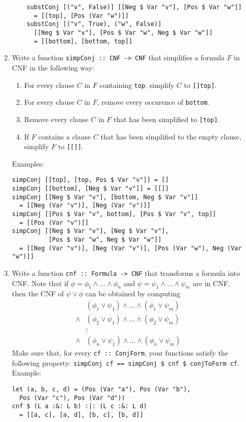 \documentclass{article}
\def\code#1{\texttt{#1}}
\begin{document}
\begin{enumerate}
\begin{enumerate}
\begin{verbatim}
    substConj [("v", False)] [[Neg $ Var "v"], [Pos $ Var "w"]]
      = [[top], [Pos (Var "w")]]
    substConj [("v", True), ("w", False)]
      [[Neg $ Var "v"], [Pos $ Var "w", Neg $ Var "w"]]
      = [[bottom], [bottom, top]]
                \end{verbatim}
            \item Write a function \code{simpConj :: CNF -> CNF} that simplifies a formula $F$ in CNF in the following way:
                \begin{enumerate}
                    \item For every clause $C$ in $F$ containing \code{top}, simplify $C$ to \code{[]top]}.
                    \item For every clause $C$ in $F$, remove every occurence of \code{bottom}.
                    \item Remove every clause $C$ in $F$ that has been simplified to \code{[top]}.
                    \item If $F$ contains a clause $C$ that has been simplified to the empty clause, simplify $F$ to \code{[[]]}.
                \end{enumerate}
                Examples:
                \begin{verbatim}
simpConj [[top], [top, Pos $ Var "v"]] = []
simpConj [[bottom], [Neg $ Var "v"]] = [[]]
simpConj [[Neg $ Var "v"], [bottom, Neg $ Var "v"]]
  = [[Neg (Var "v")], [Neg (Var "v")]]
simpConj [[Pos $ Var "v", bottom], [Pos $ Var "v", top]]
  = [[Pos (Var "v")]]
simpConj [[Neg $ Var "v"], [Neg $ Var "v"],
          [Pos $ Var "w", Neg $ Var "w"]]
  = [[Neg (Var "v")], [Neg (Var "v")], [Pos (Var "w"), Neg (Var "w")]]
                \end{verbatim}
            \item Write a function \code{cnf :: Formula -> CNF} that transforms a formula into CNF. Note that if $\phi = \phi_1 \land \dots \land \phi_n$ and $\psi = \psi_1 \land \dots \land \psi_m$ are in CNF, then the CNF of $\psi \lor \phi$ can be obtained by computing
                \begin{align*}
                          & (\phi_1 \lor \psi_1) \land \dots \land (\phi_1 \lor \psi_m) \\
                    \land & (\phi_2 \lor \psi_1) \land \dots \land (\phi_2 \lor \psi_m) \\
                          & \vdots \\
                    \land & (\phi_n \lor \psi_1) \land \dots \land (\phi_n \lor \psi_m)
                \end{align*}
                Make sure that, for every \code{cf :: ConjForm}, your functions satisfy the following property: \code{simpConj cf == simpConj \$ cnf \$ conjToForm cf}. Example:
                \begin{verbatim}
let (a, b, c, d) = (Pos (Var "a"), Pos (Var "b"),
  Pos (Var "c"), Pos (Var "d"))
cnf $ (L a :&: L b) :|: (L c :&: L d)
  = [[a, c], [a, d], [b, c], [b, d]]
                \end{verbatim}
        \end{enumerate}


\end{enumerate}
\end{document}
